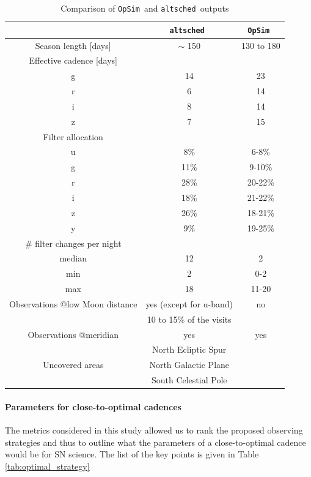 \documentclass[a4paper,10pt]{article}
\newcommand{\opsim}{{\tt OpSim\ }}
\newcommand{\altsched}{{\tt altsched\ }}
\begin{document}
\begin{table}[!htbp]
  \begin{center}
    \caption{Comparison of \opsim and \altsched outputs}\label{tab:opsim_vs_altsched}
\begin{tabular}{c|c|c}
  \hline
  \hline
 & \altsched & \opsim \\
 \hline
 Season length [days] & $\sim$ 150 & 130 to 180 \\
 \hline
 Effective cadence [days]   &        & \\
 				           g &  14  & 23 \\
 				           r &   6  & 14 \\
						   i &   8  & 14 \\
						   z &   7  & 15 \\
 \hline
 Filter allocation 			&  & \\
 				            u & 8\% & 6-8\% \\
 					  		g &  11\% & 9-10\% \\
 				           r &   28\%  & 20-22\% \\
						   i &   18\%  & 21-22\%\\
						   z &   26\%  & 18-21\% \\
						   y &   9\%  & 19-25\% \\
 \hline
 \# filter changes per night      & & \\
 				          median & 12 & 2 \\ 
 				          min    & 2 & 0-2\\
 				          max    & 18 & 11-20 \\
 \hline
 Observations @low Moon distance & yes (except for u-band)& no \\
                                 & 10 to 15\% of the visits & \\
 \hline
 Observations @meridian          & yes    & yes \\
 \hline
 				               & North Ecliptic Spur & \\
 Uncovered areas 			& North Galactic Plane & \\
 							     & South Celestial Pole &  \\
 \hline
 \end{tabular}
\end{center}
\end{table}

\paragraph{Parameters for close-to-optimal cadences} The metrics considered in this study allowed us to rank the proposed observing strategies and thus to outline what the parameters of a close-to-optimal cadence would be for SN science. The list of the key points is given in Table \ref{tab:optimal_strategy}
\end{document}
